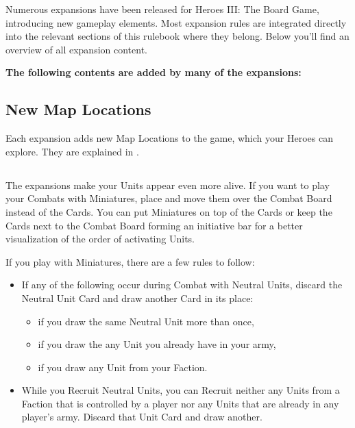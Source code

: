 
Numerous expansions have been released for Heroes III: The Board Game, introducing new gameplay elements.
Most expansion rules are integrated directly into the relevant sections of this rulebook where they belong.
Below you'll find an overview of all expansion content.

\vspace*{1em}

\textbf{The following contents are added by many of the expansions:}
\begin{multicols*}{2}
\subsection*{New Map Locations}
Each expansion adds new Map Locations to the game, which your Heroes can explore.
They are explained in .

\subsection*{}
The expansions make your Units appear even more alive.
If you want to play your Combats with Miniatures, place and move them over the Combat Board instead of the Cards.
You can put Miniatures on top of the Cards or keep the Cards next to the Combat Board forming an initiative bar for a better visualization of the order of activating Units.\par
\vspace*{1em}
If you play with Miniatures, there are a few rules to follow:
\begin{itemize}
  \item If any of the following occur during Combat with Neutral Units, discard the Neutral Unit Card and draw another Card in its place:
    \begin{itemize}
      \item if you draw the same Neutral Unit more than once,
      \item if you draw the any Unit you already have in your army,
      \item if you draw any Unit from your Faction.
    \end{itemize}
  \item While you Recruit Neutral Units, you can Recruit neither any Units from a Faction that is controlled by a player nor any Units that are already in any player's army.
  Discard that Unit Card and draw another.
\end{itemize}


\end{multicols*}
